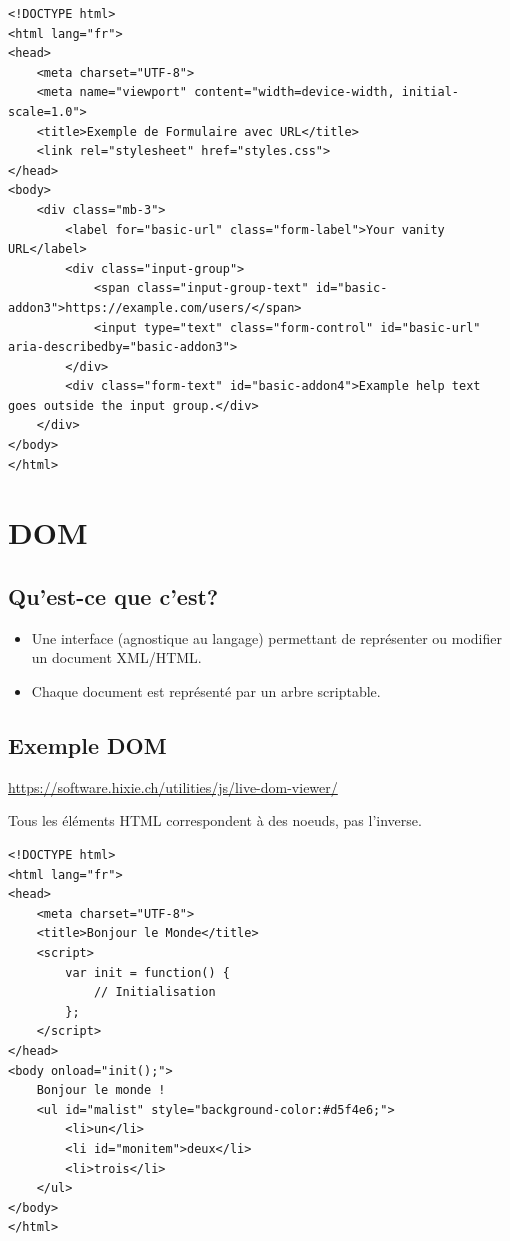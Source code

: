 \documentclass{report}
\begin{document}
\begin{multicols*}{2}
\begin{lstlisting}[style=HTMLDraculaDark]
<!DOCTYPE html>
<html lang="fr">
<head>
    <meta charset="UTF-8">
    <meta name="viewport" content="width=device-width, initial-scale=1.0">
    <title>Exemple de Formulaire avec URL</title>
    <link rel="stylesheet" href="styles.css">
</head>
<body>
    <div class="mb-3">
        <label for="basic-url" class="form-label">Your vanity URL</label>
        <div class="input-group">
            <span class="input-group-text" id="basic-addon3">https://example.com/users/</span>
            <input type="text" class="form-control" id="basic-url" aria-describedby="basic-addon3">
        </div>
        <div class="form-text" id="basic-addon4">Example help text goes outside the input group.</div>
    </div>
</body>
</html>
\end{lstlisting}


\chapter{DOM}



\section*{Qu'est-ce que c'est?}

\begin{itemize}
    \item Une interface (agnostique au langage) permettant de représenter ou modifier un document XML/HTML.
    \item Chaque document est représenté par un arbre scriptable.
\end{itemize}

\section*{Exemple DOM}

\url{https://software.hixie.ch/utilities/js/live-dom-viewer/}

Tous les éléments HTML correspondent à des noeuds, pas l'inverse.

\begin{lstlisting}[style=HTMLDraculaDark]
<!DOCTYPE html>
<html lang="fr">
<head>
    <meta charset="UTF-8">
    <title>Bonjour le Monde</title>
    <script>
        var init = function() {
            // Initialisation
        };
    </script>
</head>
<body onload="init();">
    Bonjour le monde !
    <ul id="malist" style="background-color:#d5f4e6;">
        <li>un</li>
        <li id="monitem">deux</li>
        <li>trois</li>
    </ul>
</body>
</html>
\end{lstlisting}


\end{multicols*}
\end{document}
